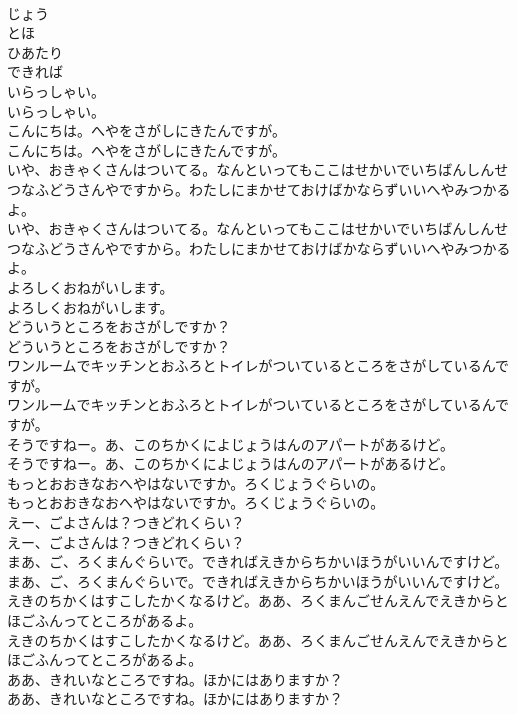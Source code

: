 \documentclass[8pt]{extreport}
\begin{document}
\begin{CJK}{UTF8}{min}
\\	じょう
\\	とほ
\\	ひあたり
\\	できれば
\\	いらっしゃい。
\\	いらっしゃい。
\\	こんにちは。へやをさがしにきたんですが。
\\	こんにちは。へやをさがしにきたんですが。
\\	いや、おきゃくさんはついてる。なんといってもここはせかいでいちばんしんせつなふどうさんやですから。わたしにまかせておけばかならずいいへやみつかるよ。
\\	いや、おきゃくさんはついてる。なんといってもここはせかいでいちばんしんせつなふどうさんやですから。わたしにまかせておけばかならずいいへやみつかるよ。
\\	よろしくおねがいします。
\\	よろしくおねがいします。
\\	どういうところをおさがしですか？
\\	どういうところをおさがしですか？
\\	ワンルームでキッチンとおふろとトイレがついているところをさがしているんですが。
\\	ワンルームでキッチンとおふろとトイレがついているところをさがしているんですが。
\\	そうですねー。あ、このちかくによじょうはんのアパートがあるけど。
\\	そうですねー。あ、このちかくによじょうはんのアパートがあるけど。
\\	もっとおおきなおへやはないですか。ろくじょうぐらいの。
\\	もっとおおきなおへやはないですか。ろくじょうぐらいの。
\\	えー、ごよさんは？つきどれくらい？
\\	えー、ごよさんは？つきどれくらい？
\\	まあ、ご、ろくまんぐらいで。できればえきからちかいほうがいいんですけど。
\\	まあ、ご、ろくまんぐらいで。できればえきからちかいほうがいいんですけど。
\\	えきのちかくはすこしたかくなるけど。ああ、ろくまんごせんえんでえきからとほごふんってところがあるよ。
\\	えきのちかくはすこしたかくなるけど。ああ、ろくまんごせんえんでえきからとほごふんってところがあるよ。
\\	ああ、きれいなところですね。ほかにはありますか？
\\	ああ、きれいなところですね。ほかにはありますか？

\end{CJK}
\end{document}

